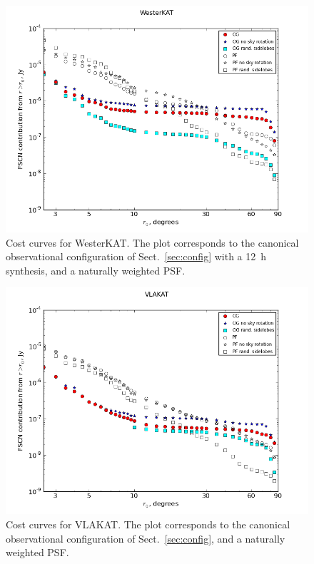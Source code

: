 \documentclass{aa}
\begin{document}
\begin{figure}
  \includegraphics[width=\columnwidth]{cc-westerkat}
  \caption{\label{fig:cc-westerkat}Cost curves for WesterKAT. The plot corresponds to the canonical observational configuration of Sect.~\ref{sec:config} with a 12~h synthesis, and a naturally weighted PSF.}
\end{figure}
\begin{figure}
  \includegraphics[width=\columnwidth]{cc-vlakat}
  \caption{\label{fig:cc-vlakat}Cost curves for VLAKAT. The plot corresponds to the canonical observational configuration of Sect.~\ref{sec:config}, and a naturally weighted PSF.}
\end{figure}
\end{document}
